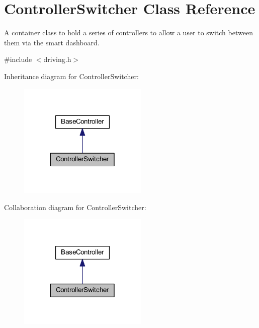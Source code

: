 \hypertarget{class_controller_switcher}{\section{\-Controller\-Switcher \-Class \-Reference}
\label{class_controller_switcher}
}


\-A container class to hold a series of controllers to allow a user to switch between them via the smart dashboard.  




{\ttfamily \#include $<$driving.\-h$>$}



\-Inheritance diagram for \-Controller\-Switcher\-:\nopagebreak
\begin{figure}[H]
\begin{center}
\leavevmode
\includegraphics[width=174pt]{class_controller_switcher__inherit__graph}
\end{center}
\end{figure}


\-Collaboration diagram for \-Controller\-Switcher\-:\nopagebreak
\begin{figure}[H]
\begin{center}
\leavevmode
\includegraphics[width=174pt]{class_controller_switcher__coll__graph}
\end{center}
\end{figure}
